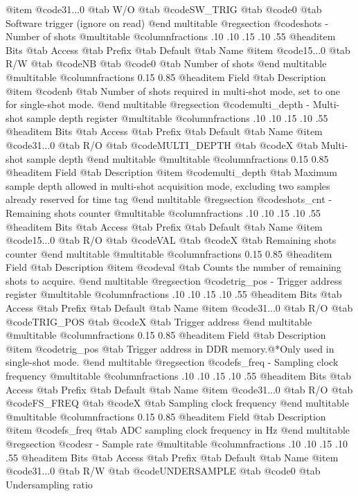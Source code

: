@item @code{31...0}
@tab W/O @tab
@code{SW_TRIG}
@tab @code{0} @tab 
Software trigger (ignore on read)
@end multitable
@regsection @code{shots} - Number of shots
@multitable @columnfractions .10 .10 .15 .10 .55
@headitem Bits @tab Access @tab Prefix @tab Default @tab Name
@item @code{15...0}
@tab R/W @tab
@code{NB}
@tab @code{0} @tab 
Number of shots
@end multitable
@multitable @columnfractions 0.15 0.85
@headitem Field @tab Description
@item @code{nb} @tab Number of shots required in multi-shot mode, set to one for single-shot mode.
@end multitable
@regsection @code{multi_depth} - Multi-shot sample depth register
@multitable @columnfractions .10 .10 .15 .10 .55
@headitem Bits @tab Access @tab Prefix @tab Default @tab Name
@item @code{31...0}
@tab R/O @tab
@code{MULTI_DEPTH}
@tab @code{X} @tab 
Multi-shot sample depth
@end multitable
@multitable @columnfractions 0.15 0.85
@headitem Field @tab Description
@item @code{multi_depth} @tab Maximum sample depth allowed in multi-shot acquisition mode, excluding two samples already reserved for time tag
@end multitable
@regsection @code{shots_cnt} - Remaining shots counter
@multitable @columnfractions .10 .10 .15 .10 .55
@headitem Bits @tab Access @tab Prefix @tab Default @tab Name
@item @code{15...0}
@tab R/O @tab
@code{VAL}
@tab @code{X} @tab 
Remaining shots counter
@end multitable
@multitable @columnfractions 0.15 0.85
@headitem Field @tab Description
@item @code{val} @tab Counts the number of remaining shots to acquire.
@end multitable
@regsection @code{trig_pos} - Trigger address register
@multitable @columnfractions .10 .10 .15 .10 .55
@headitem Bits @tab Access @tab Prefix @tab Default @tab Name
@item @code{31...0}
@tab R/O @tab
@code{TRIG_POS}
@tab @code{X} @tab 
Trigger address
@end multitable
@multitable @columnfractions 0.15 0.85
@headitem Field @tab Description
@item @code{trig_pos} @tab Trigger address in DDR memory.@*Only used in single-shot mode.
@end multitable
@regsection @code{fs_freq} - Sampling clock frequency
@multitable @columnfractions .10 .10 .15 .10 .55
@headitem Bits @tab Access @tab Prefix @tab Default @tab Name
@item @code{31...0}
@tab R/O @tab
@code{FS_FREQ}
@tab @code{X} @tab 
Sampling clock frequency
@end multitable
@multitable @columnfractions 0.15 0.85
@headitem Field @tab Description
@item @code{fs_freq} @tab ADC sampling clock frequency in Hz
@end multitable
@regsection @code{sr} - Sample rate
@multitable @columnfractions .10 .10 .15 .10 .55
@headitem Bits @tab Access @tab Prefix @tab Default @tab Name
@item @code{31...0}
@tab R/W @tab
@code{UNDERSAMPLE}
@tab @code{0} @tab 
Undersampling ratio
